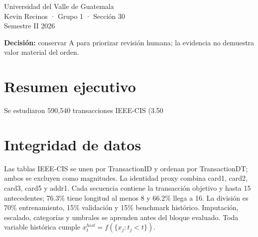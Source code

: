 \documentclass[9.5pt]{article}
\begin{document}
\begin{titlepage}\pagecolor{navy}\color{white}\raggedright\vspace*{1cm}{\Large DEEP LEARNING Y SISTEMAS INTELIGENTES\par}\vspace{1cm}{\Huge\bfseries Proyecto 1\\Monitoreo transaccional\par}\vspace{.6cm}{\LARGE Detectar lo que el orden revela · V5 integrada\par}\vfill{\Large Universidad del Valle de Guatemala\\Kevin Recinos · Grupo 1 · Sección 30\\Semestre II 2026\par}\vspace{1cm}{\Large Wilson Alejandro Calderón Argueta · 22018\\Pablo Daniel Barillas Moreno · 22193\par}\vfill\textbf{Decisión:} conservar A para priorizar revisión humana; la evidencia no demuestra valor material del orden.\end{titlepage}\nopagecolor

\section*{Resumen ejecutivo} Se estudiaron 590,540 transacciones IEEE-CIS (3.50%

\section{Integridad de datos} Las tablas IEEE-CIS se unen por TransactionID y ordenan por TransactionDT; ambos se excluyen como magnitudes. La identidad proxy combina card1, card2, card3, card5 y addr1. Cada secuencia contiene la transacción objetivo y hasta 15 antecedentes; 76.3\% tiene longitud al menos 8 y 66.2\% llega a 16. La división es 70\% entrenamiento, 15\% validación y 15\% benchmark histórico. Imputación, escalado, categorías y umbrales se aprenden antes del bloque evaluado. Toda variable histórica cumple $x_t^{hist}=f(\{x_j:t_j<t\})$.
\end{document}
